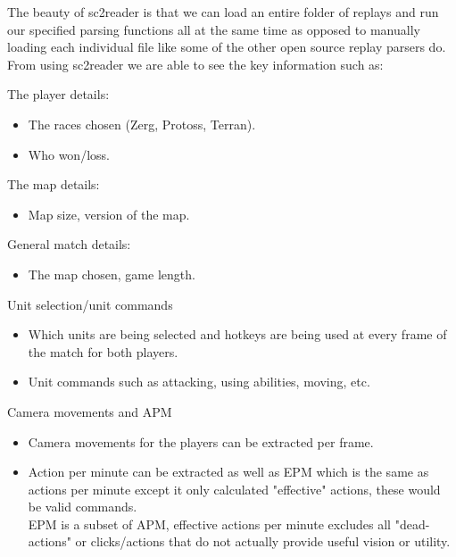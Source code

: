 \documentclass[a4paper,12pt]{report}
\begin{document}
The beauty of sc2reader is that we can load an entire folder of replays and run our specified parsing functions all at the same time as opposed to manually loading each individual file like some of the other open source replay parsers do.
From using sc2reader we are able to see the key information such as:

The player details:
\vspace*{-.9cm}
\begin{itemize}[,]
    \setlength\itemsep{-.1cm}
    \item The races chosen (Zerg, Protoss, Terran).
    \item Who won/loss.
\end{itemize}
\vspace*{-.4cm}
The map details:
\vspace*{-.9cm}
\begin{itemize}[,]
    \setlength\itemsep{-.1cm}
    \item Map size, version of the map.
\end{itemize}
\vspace*{-.4cm}
General match details:
\vspace*{-.9cm}
\begin{itemize}[,]
    \setlength\itemsep{-.1cm}
    \item The map chosen, game length.
\end{itemize}
\vspace*{-.4cm}
Unit selection/unit commands
\vspace*{-.9cm}
\begin{itemize}[,]
    \setlength\itemsep{-.1cm}
    \item Which units are being selected and hotkeys are being used at every frame of the match for both players.
    \item Unit commands such as attacking, using abilities, moving, etc.
\end{itemize}
\vspace*{-.4cm}
Camera movements and APM
\vspace*{-.9cm}
\begin{itemize}[,]
    \setlength\itemsep{-.1cm}
    \item Camera movements for the players can be extracted per frame.
    \item Action per minute can be extracted as well as EPM which is the same as actions per minute except it only calculated "effective" actions, these would be valid commands. \\
    EPM is a subset of APM, effective actions per minute excludes all "dead-actions" or clicks/actions that do not actually provide useful vision or utility.
\end{itemize}
\end{document}
